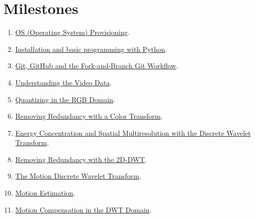 \section{Milestones}
\begin{enumerate}
\item \href{https://sistemas-multimedia.github.io/study_guide/01-provisioning/}{OS (Operating System) Provisioning}.
\item \href{https://sistemas-multimedia.github.io/study_guide/02-python/}{Installation and basic programming with Python}.
\item \href{https://sistemas-multimedia.github.io/study_guide/03-git/}{Git, GitHub and the Fork-and-Branch Git Workflow}.
\item \href{https://sistemas-multimedia.github.io/study_guide/04-the_data/}{Understanding the Video Data}.
\item \href{https://sistemas-multimedia.github.io/study_guide/05-quantization/}{Quantizing in the RGB Domain}.
\item \href{https://sistemas-multimedia.github.io/study_guide/06-color_transform/}{Removing Redundancy with a Color Transform}.
\item \href{https://sistemas-multimedia.github.io/study_guide/07-DWT/}{Energy Concentration and Spatial Multiresolution with the Discrete Wavelet Transform}.
\item \href{https://sistemas-multimedia.github.io/study_guide/08-2D-DWT/}{Removing Redundancy with the 2D-DWT}.
\item \href{https://sistemas-multimedia.github.io/study_guide/09-MDWT/}{The Motion Discrete Wavelet Transform}.
\item \href{https://sistemas-multimedia.github.io/study_guide/10-ME/}{Motion Estimation}.
\item \href{https://sistemas-multimedia.github.io/study_guide/11-MC_in_DWT_domain/}{Motion Compensation in the DWT Domain}.
\end{enumerate}

